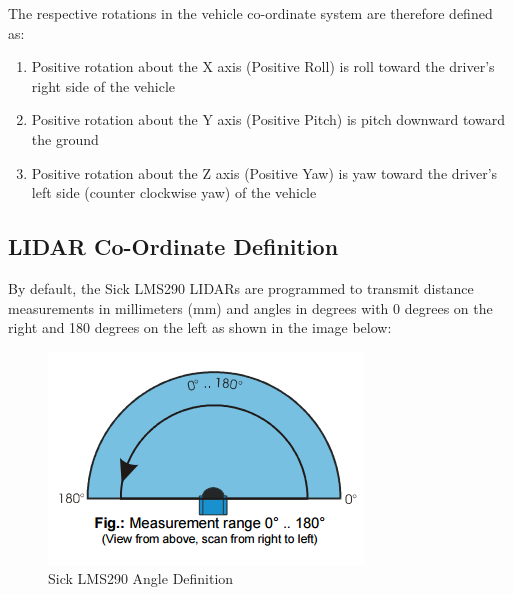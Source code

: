 \newpage

\noindent The respective rotations in the vehicle co-ordinate system are therefore defined as:

\begin{enumerate}
\item Positive rotation about the X axis (Positive Roll) is roll toward the driver's right side of the vehicle
\item Positive rotation about the Y axis (Positive Pitch) is pitch downward toward the ground
\item Positive rotation about the Z axis (Positive Yaw) is yaw toward the driver's left side (counter clockwise yaw) of the vehicle
\end{enumerate}

\newpage

\subsection{LIDAR Co-Ordinate Definition}
By default, the Sick LMS290 LIDARs are programmed to transmit distance measurements in millimeters (mm) and angles in degrees with 0 degrees on the right and 180 degrees on the left as shown in the image below:

\begin{figure}[h!]
\centering
\includegraphics[scale=.9]{Photos/LIDAR_AngleDef.png}
\caption[Sick LMS290 Angle Definition]{Sick LMS290 Angle Definition \protect \footnotemark}
\label{fig:sick_angledef}
\end{figure} 
